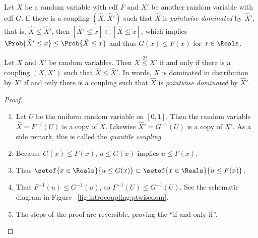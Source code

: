 \documentclass[12pt]{article}
\begin{document}
Let \( X \) be a random variable with cdf \( F \) and \( X' \) be
another random variable with cdf \( G \).  If there is a coupling \( (\hat
{X}, \hat{X}') \) such that \( \hat{X} \) is \emph{pointwise dominated}
by \( \hat{X}' \), that is, \( \hat{X} \le \hat{X}' \), then \( [\hat{X}'
\le x] \subset [\hat{X} \le x] \), which implies \( \Prob{\hat{X}' \le x}
\le \Prob{\hat{X} \le x} \) and thus \( G(x) \le F(x) \) for \( x \in
\Reals \).

\begin{proposition}
    Let \( X \) and \( X' \) be random variables.  Then \( X \stackrel{\mathcal
    {D}}{\le} X' \) if and only if there is a coupling \( (X,X') \) such
    that \( \hat{X} \le \hat{X}' \).  In words, \( X \) is dominated in
    distribution by \( X' \) if and only there is a coupling such that \(
    \hat{X} \) is \emph{pointwise dominated} by \( \hat{X}' \).
\end{proposition}

\begin{proof}
    \begin{enumerate}
        \item
            Let \( U \) be the uniform random variable on \( [0,1] \).
            Then the random variable \( \hat{X} = F^{-1}(U) \) is a copy
            of \( X \).  Likewise \( \hat{X}' = G^{-1}(U) \) is a copy
            of \( X' \).  As a side remark, this is called the \emph{quantile
            coupling}.%
        \item
            Because \( G(x) \le F(x) \), \( u \le G(x) \) implies \( u
            \le F(x) \).
        \item
            Thus \( \setof{x \in \Reals}{u \le G(x)} \subset \setof{x
            \in \Reals}{u \le F(x)} \).
        \item
            Thus \( F^{-1}(u) \le G^{-1}(u) \), so \( F^{-1}(U) \le G^{-1}
            (U) \).  See the schematic diagram in Figure~%
            \ref{fig:introcoupling:ptwisedom}.
        \item
            The steps of the proof are reversible, proving the ``if and
            only if''.
    \end{enumerate}
\end{proof}
\end{document}
